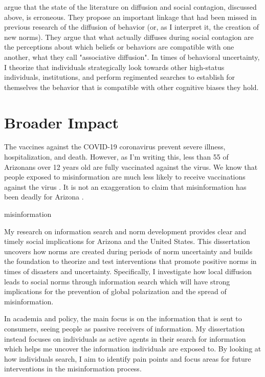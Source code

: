 \citet{goldbergSocialContagionAssociative2018} argue that the state of the literature on
diffusion and social contagion, discussed above, is erroneous. They
propose an important linkage that had been missed in previous research
of the diffusion of behavior (or, as I interpret it, the creation of new
norms). They argue that what actually diffuses during social contagion
are the perceptions about which beliefs or behaviors are compatible with
one another, what they call "associative diffusion". In times of
behavioral uncertainty, I theorize that individuals strategically look
towards other high-status individuals, institutions, and perform
regimented searches to establish for themselves the behavior that is
compatible with other cognitive biases they hold.

\section{Broader Impact}


The vaccines against the COVID-19 coronavirus prevent severe illness,
hospitalization, and death. However, as I'm writing this, less than 55%
of Arizonans over 12 years old are fully vaccinated against the virus.
We know that people exposed to misinformation are much less likely to
receive vaccinations against the virus \citep{loombaMeasuringImpactCOVID192021}. It is not
an exaggeration to claim that misinformation has been deadly for Arizona
\citep{pathakInfodemicsCOVID19Role2020}.

misinformation \citep{greene_murphy21}

My research on information search and norm development provides clear
and timely social implications for Arizona and the United States. This
dissertation uncovers how norms are created during periods of norm
uncertainty and builds the foundation to theorize and test interventions
that promote positive norms in times of disasters and uncertainty.
Specifically, I investigate how local diffusion leads to social norms
through information search which will have strong implications for the
prevention of global polarization and the spread of misinformation.

In academia and policy, the main focus is on the information that is
sent to consumers, seeing people as passive receivers of information. My dissertation instead
focuses on individuals as active agents in their search for information
which helps me uncover the information individuals are exposed to. By
looking at how individuals search, I aim to identify pain points and focus areas for
future interventions in the misinformation process.

